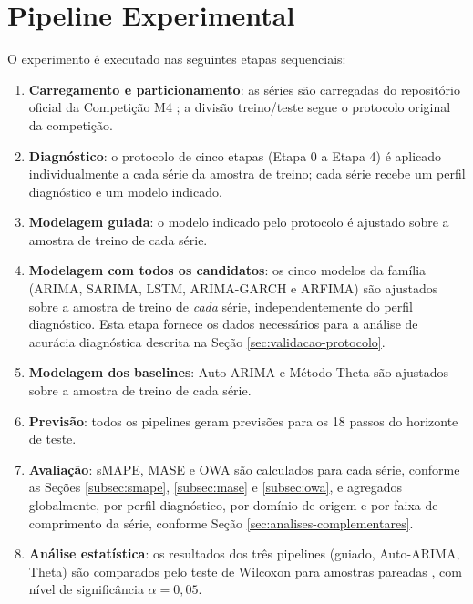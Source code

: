 \documentclass[
  12pt,
  openright,
  twoside,
  a4paper,
  english,
  brazil
]{abntex2}
\begin{document}
\section{Pipeline Experimental}
\label{sec:pipeline}

O experimento é executado nas seguintes etapas sequenciais:

\begin{enumerate}
  \item \textbf{Carregamento e particionamento}: as séries são carregadas do repositório oficial da Competição M4 \cite{makridakis2020m4}; a divisão treino/teste segue o protocolo original da competição.
  \item \textbf{Diagnóstico}: o protocolo de cinco etapas (Etapa 0 a Etapa 4) é aplicado individualmente a cada série da amostra de treino; cada série recebe um perfil diagnóstico e um modelo indicado.
  \item \textbf{Modelagem guiada}: o modelo indicado pelo protocolo é ajustado sobre a amostra de treino de cada série.
  \item \textbf{Modelagem com todos os candidatos}: os cinco modelos da família (ARIMA, SARIMA, LSTM, ARIMA-GARCH e ARFIMA) são ajustados sobre a amostra de treino de \emph{cada} série, independentemente do perfil diagnóstico. Esta etapa fornece os dados necessários para a análise de acurácia diagnóstica descrita na Seção \ref{sec:validacao-protocolo}.
  \item \textbf{Modelagem dos baselines}: Auto-ARIMA e Método Theta são ajustados sobre a amostra de treino de cada série.
  \item \textbf{Previsão}: todos os pipelines geram previsões para os 18 passos do horizonte de teste.
  \item \textbf{Avaliação}: sMAPE, MASE e OWA são calculados para cada série, conforme as Seções \ref{subsec:smape}, \ref{subsec:mase} e \ref{subsec:owa}, e agregados globalmente, por perfil diagnóstico, por domínio de origem e por faixa de comprimento da série, conforme Seção \ref{sec:analises-complementares}.
  \item \textbf{Análise estatística}: os resultados dos três pipelines (guiado, Auto-ARIMA, Theta) são comparados pelo teste de Wilcoxon para amostras pareadas \cite{wilcoxon1945individual}, com nível de significância $\alpha = 0{,}05$.
\end{enumerate}

\end{document}

